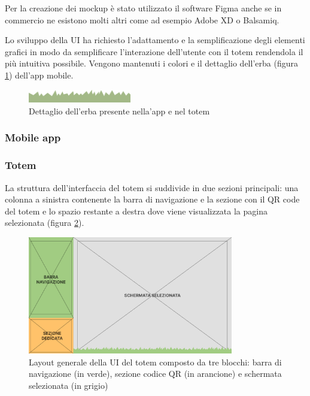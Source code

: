 Per la creazione dei mockup è stato utilizzato il software Figma anche se in commercio ne esistono molti altri come ad esempio Adobe XD o Balsamiq.

Lo sviluppo della UI ha richiesto l'adattamento e la semplificazione degli elementi grafici in modo da semplificare l'interazione dell'utente con il totem rendendola il più intuitiva possibile. Vengono mantenuti i colori e il dettaglio dell'erba (figura \ref{fig:grassDetails}) dell'app mobile.

\begin{figure}
    \centering
    \includegraphics[width=0.4\textwidth]{img/grassDetail.png}
    \caption{Dettaglio dell'erba presente nella'app e nel totem}
    \label{fig:grassDetails}
\end{figure}

\subsubsection{Mobile app}


\subsubsection{Totem}
La struttura dell'interfaccia del totem si suddivide in due sezioni principali: una colonna a sinistra contenente la barra di navigazione e la sezione con il QR code del totem e lo spazio restante a destra dove viene visualizzata la pagina selezionata (figura \ref{fig:viewStruct}).
\begin{figure}[h]
    \centering
    \includegraphics[width=0.8\textwidth]{img/mainStructure.png}
    \caption{Layout generale della UI del totem composto da tre blocchi: barra di navigazione (in verde), sezione codice QR (in arancione) e schermata selezionata (in grigio)}
    \label{fig:viewStruct}
\end{figure}

